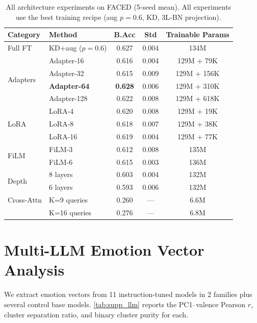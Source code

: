 \begin{table}[!h]
\caption{All architecture experiments on FACED (5-seed mean). All experiments use the best training recipe (aug $p = 0.6$, KD, 3L-BN projection).}
\small
\centering
\begin{tabular}{llccc}
\toprule
Category & Method & B.Acc & Std & Trainable Params \\
\midrule
Full FT & KD+aug ($p=0.6$) & 0.627 & 0.004 & 134M \\
\midrule
\multirow{4}{*}{Adapters} & Adapter-16 & 0.616 & 0.004 & 129M + 79K \\
 & Adapter-32 & 0.615 & 0.009 & 129M + 156K \\
 & \textbf{Adapter-64} & \textbf{0.628} & 0.006 & 129M + 310K \\
 & Adapter-128 & 0.622 & 0.008 & 129M + 618K \\
\midrule
\multirow{3}{*}{LoRA} & LoRA-4 & 0.620 & 0.008 & 129M + 19K \\
 & LoRA-8 & 0.618 & 0.007 & 129M + 38K \\
 & LoRA-16 & 0.619 & 0.004 & 129M + 77K \\
\midrule
\multirow{2}{*}{FiLM} & FiLM-3 & 0.612 & 0.008 & 135M \\
 & FiLM-6 & 0.615 & 0.003 & 136M \\
\midrule
\multirow{2}{*}{Depth} & 8 layers & 0.603 & 0.004 & 132M \\
 & 6 layers & 0.593 & 0.006 & 132M \\
\midrule
Cross-Attn & K=9 queries & 0.260 & --- & 6.6M \\
 & K=16 queries & 0.276 & --- & 6.8M \\
\bottomrule
\end{tabular}
\label{tab:supp_arch}
\end{table}

\section{Multi-LLM Emotion Vector Analysis}
\label{sec:supp_llm}

We extract emotion vectors from 11 instruction-tuned models in 2 families plus several control base models. \cref{tab:supp_llm} reports the PC1--valence Pearson $r$, cluster separation ratio, and binary cluster purity for each.

